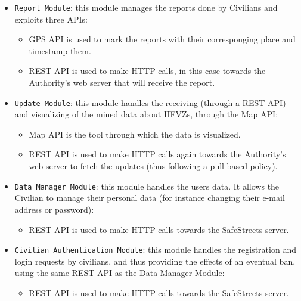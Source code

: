 \documentclass[12pt,a4paper]{article}
\begin{document}
\begin{itemize}
	\item \texttt{Report Module}: this module manages the reports done by Civilians and exploits three APIs:
	\begin{itemize}
		\item GPS API is used to mark the reports with their corresponging place and timestamp them.
		\item REST API is used to make HTTP calls, in this case towards the Authority's web server that will receive the report.
		\end{itemize}
	\item \texttt{Update Module}: this module handles the receiving (through a REST API) and visualizing of the mined data about HFVZs, through the Map API:
\begin{itemize}
		\item Map API is the tool through which the data is visualized.
		\item REST API is used to make HTTP calls again towards the Authority's web server to fetch the updates (thus following a pull-based policy).
		\end{itemize}
	\item \texttt{Data Manager Module}: this module handles the users data. It allows the Civilian to manage their personal data (for instance changing their e-mail address or password):
	\begin{itemize}
		\item REST API is used to make HTTP calls towards the SafeStreets server.
		\end{itemize}
	\item \texttt{Civilian Authentication Module}: this module handles the registration and login requests by civilians, and thus providing the effects of an eventual ban, using the same REST API as the Data Manager Module:
\begin{itemize}
		\item REST API is used to make HTTP calls towards the SafeStreets server.
		\end{itemize}
\end{itemize}
\newpage
\end{document}
